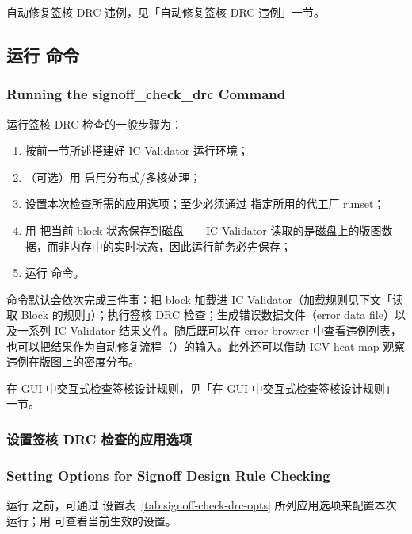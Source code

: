 \begin{seeAlsoBox}
自动修复签核 DRC 违例，见「自动修复签核 DRC 违例」一节。
\end{seeAlsoBox}

\subsection{运行  命令}
\subsubsection*{Running the signoff\_check\_drc Command}

运行签核 DRC 检查的一般步骤为：
\begin{enumerate}
  \item 按前一节所述搭建好 IC Validator 运行环境；
  \item （可选）用  启用分布式/多核处理；
  \item 设置本次检查所需的应用选项；至少必须通过  指定所用的代工厂 runset；
  \item 用  把当前 block 状态保存到磁盘——IC Validator 读取的是磁盘上的版图数据，而非内存中的实时状态，因此运行前务必先保存；
  \item 运行  命令。
\end{enumerate}

命令默认会依次完成三件事：把 block 加载进 IC Validator（加载规则见下文「读取 Block 的规则」）；执行签核 DRC 检查；生成错误数据文件（error data file）以及一系列 IC Validator 结果文件。随后既可以在 error browser 中查看违例列表，也可以把结果作为自动修复流程（）的输入。此外还可以借助 ICV heat map 观察违例在版图上的密度分布。

\begin{seeAlsoBox}
在 GUI 中交互式检查签核设计规则，见「在 GUI 中交互式检查签核设计规则」一节。
\end{seeAlsoBox}

\subsubsection{设置签核 DRC 检查的应用选项}
\subsubsection*{Setting Options for Signoff Design Rule Checking}

运行  之前，可通过  设置表~\ref{tab:signoff-check-drc-opts} 所列应用选项来配置本次运行；用  可查看当前生效的设置。

